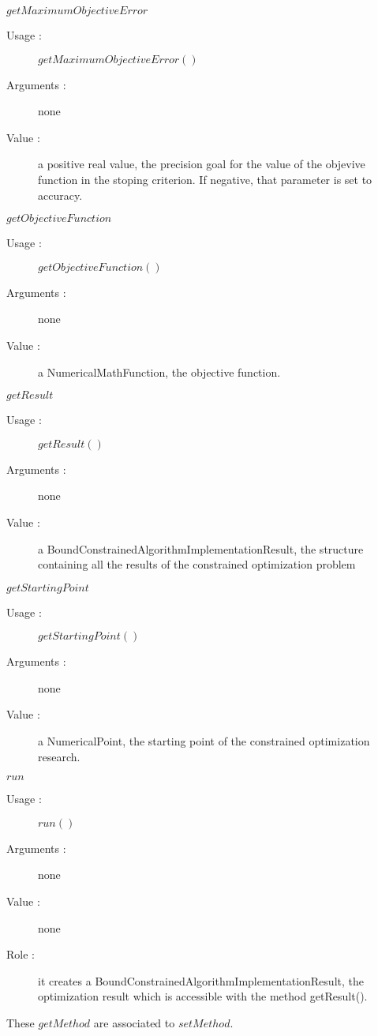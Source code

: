 \begin{description}
\begin{description}
  \item $getMaximumObjectiveError$
    \begin{description}
    \item[Usage :] $getMaximumObjectiveError()$
    \item[Arguments :] none
    \item[Value :] a positive real value, the precision goal for the value of the objevive function in the stoping criterion. If negative, that parameter is set to accuracy.
    \end{description}
    \bigskip

  \item $getObjectiveFunction$
    \begin{description}
    \item[Usage :] $getObjectiveFunction()$
    \item[Arguments :] none
    \item[Value :] a NumericalMathFunction, the objective function.
    \end{description}
    \bigskip

  \item $getResult$
    \begin{description}
    \item[Usage :] $getResult()$
    \item[Arguments :] none
    \item[Value :] a BoundConstrainedAlgorithmImplementationResult, the structure containing all the results of the constrained optimization problem
    \end{description}
    \bigskip

  \item $getStartingPoint$
    \begin{description}
    \item[Usage :] $getStartingPoint()$
    \item[Arguments :] none
    \item[Value :] a NumericalPoint, the starting point of the constrained optimization research.
    \end{description}
    \bigskip

  \item $run$
    \begin{description}
    \item[Usage :] $run()$
    \item[Arguments :] none
    \item[Value :] none
    \item[Role :] it creates a BoundConstrainedAlgorithmImplementationResult, the optimization result which is accessible with the method getResult().
    \end{description}


  \end{description}


  These  $getMethod$  are associated to  $setMethod$.


\end{description}



